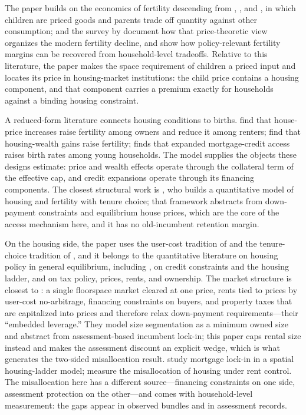 \documentclass[11pt]{article}
\newcommand{\1}{\mathbf 1}
\begin{document}
The paper builds on the economics of fertility descending from \citet{becker1960}, \citet{beckerlewis1973}, and \citet{barro1988,barro1989}, in which children are priced goods and parents trade off quantity against other consumption; \citet{galorweil1996} and the survey by \citet{doepkeetal2023} document how that price-theoretic view organizes the modern fertility decline, and \citet{doepkekindermann2019} show how policy-relevant fertility margins can be recovered from household-level tradeoffs. Relative to this literature, the paper makes the space requirement of children a priced input and locates its price in housing-market institutions: the child price contains a housing component, and that component carries a premium exactly for households against a binding housing constraint.

A reduced-form literature connects housing conditions to births. \citet{dettlingkearney2014} find that house-price increases raise fertility among owners and reduce it among renters; \citet{lovenheimmumford2013} find that housing-wealth gains raise fertility; \citet{hacamo2021} finds that expanded mortgage-credit access raises birth rates among young households. The model supplies the objects these designs estimate: price and wealth effects operate through the collateral term of the effective cap, and credit expansions operate through its financing components. The closest structural work is \citet{couillard2025}, who builds a quantitative model of housing and fertility with tenure choice; that framework abstracts from down-payment constraints and equilibrium house prices, which are the core of the access mechanism here, and it has no old-incumbent retention margin.

On the housing side, the paper uses the user-cost tradition of \citet{poterba1984} and the tenure-choice tradition of \citet{hendersonioannides1983}, and it belongs to the quantitative literature on housing policy in general equilibrium, including \citet{gervais2002}, \citet{ortalomagnerady2006} on credit constraints and the housing ladder, and \citet{sommersullivan2018} on tax policy, prices, rents, and ownership. The market structure is closest to \citet{coven2024}: a single floorspace market cleared at one price, rents tied to prices by user-cost no-arbitrage, financing constraints on buyers, and property taxes that are capitalized into prices and therefore relax down-payment requirements---their ``embedded leverage.'' They model size segmentation as a minimum owned size and abstract from assessment-based incumbent lock-in; this paper caps rental size instead and makes the assessment discount an explicit wedge, which is what generates the two-sided misallocation result. \citet{fonseca2024} study mortgage lock-in in a spatial housing-ladder model; \citet{glaeserluttmer2003} measure the misallocation of housing under rent control. The misallocation here has a different source---financing constraints on one side, assessment protection on the other---and comes with household-level measurement: the gaps appear in observed bundles and in assessment records.
\end{document}
